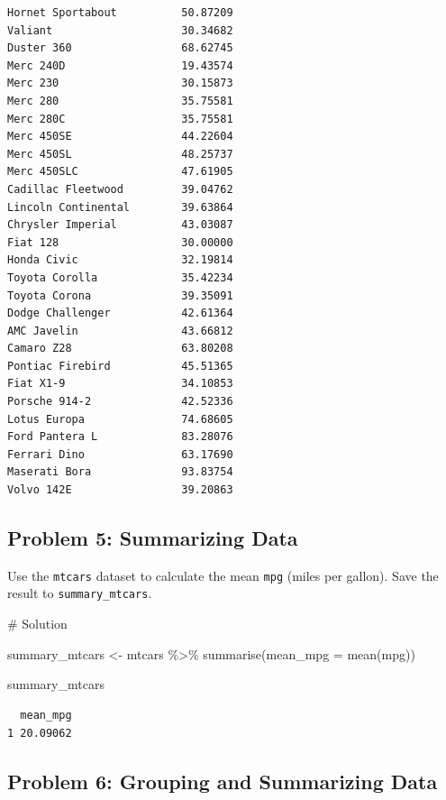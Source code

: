 \documentclass[
  letterpaper,
  DIV=11,
  numbers=noendperiod]{scrreprt}
\newenvironment{Shaded}{\begin{snugshade}}{\end{snugshade}}
\newcommand{\AttributeTok}[1]{\textcolor[rgb]{0.40,0.45,0.13}{#1}}
\newcommand{\CommentTok}[1]{\textcolor[rgb]{0.37,0.37,0.37}{#1}}
\newcommand{\FunctionTok}[1]{\textcolor[rgb]{0.28,0.35,0.67}{#1}}
\newcommand{\NormalTok}[1]{\textcolor[rgb]{0.00,0.23,0.31}{#1}}
\newcommand{\OtherTok}[1]{\textcolor[rgb]{0.00,0.23,0.31}{#1}}
\newcommand{\SpecialCharTok}[1]{\textcolor[rgb]{0.37,0.37,0.37}{#1}}
\begin{document}
\begin{verbatim}
Hornet Sportabout          50.87209
Valiant                    30.34682
Duster 360                 68.62745
Merc 240D                  19.43574
Merc 230                   30.15873
Merc 280                   35.75581
Merc 280C                  35.75581
Merc 450SE                 44.22604
Merc 450SL                 48.25737
Merc 450SLC                47.61905
Cadillac Fleetwood         39.04762
Lincoln Continental        39.63864
Chrysler Imperial          43.03087
Fiat 128                   30.00000
Honda Civic                32.19814
Toyota Corolla             35.42234
Toyota Corona              39.35091
Dodge Challenger           42.61364
AMC Javelin                43.66812
Camaro Z28                 63.80208
Pontiac Firebird           45.51365
Fiat X1-9                  34.10853
Porsche 914-2              42.52336
Lotus Europa               74.68605
Ford Pantera L             83.28076
Ferrari Dino               63.17690
Maserati Bora              93.83754
Volvo 142E                 39.20863
\end{verbatim}

\subsection*{Problem 5: Summarizing
Data}\label{problem-5-summarizing-data}

Use the \texttt{mtcars} dataset to calculate the mean \texttt{mpg}
(miles per gallon). Save the result to \texttt{summary\_mtcars}.

\begin{Shaded}
\begin{Highlighting}[]
\CommentTok{\# Solution}

\NormalTok{summary\_mtcars }\OtherTok{\textless{}{-}}\NormalTok{ mtcars }\SpecialCharTok{\%\textgreater{}\%}
  \FunctionTok{summarise}\NormalTok{(}\AttributeTok{mean\_mpg =} \FunctionTok{mean}\NormalTok{(mpg))}

\NormalTok{summary\_mtcars}
\end{Highlighting}
\end{Shaded}

\begin{verbatim}
  mean_mpg
1 20.09062
\end{verbatim}

\subsection*{Problem 6: Grouping and Summarizing
Data}\label{problem-6-grouping-and-summarizing-data}
\end{document}
